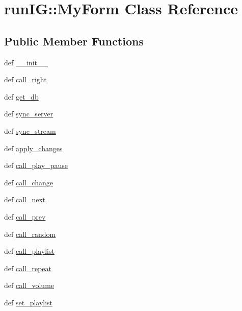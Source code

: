 \hypertarget{classrunIG_1_1MyForm}{
\section{runIG::MyForm Class Reference}
\label{classrunIG_1_1MyForm}
}
\subsection*{Public Member Functions}
\begin{DoxyCompactItemize}
\item 
def \hyperlink{classrunIG_1_1MyForm_a9d9f552af78608303dd1cb70f6d6f788}{\_\-\_\-init\_\-\_\-}
\item 
def \hyperlink{classrunIG_1_1MyForm_adb1a13ae48fdab99d7bb1afc7b12ea80}{call\_\-right}
\item 
def \hyperlink{classrunIG_1_1MyForm_a1ec95d0e4da5677507ac9817996838c9}{get\_\-db}
\item 
def \hyperlink{classrunIG_1_1MyForm_aad9eb7014ac06e3c3dfb6967313c5bfb}{sync\_\-server}
\item 
def \hyperlink{classrunIG_1_1MyForm_a965c1259e4922776fb00cc829c492842}{sync\_\-stream}
\item 
def \hyperlink{classrunIG_1_1MyForm_a7c1fc8b472aab7d4460ec61abd672538}{apply\_\-changes}
\item 
def \hyperlink{classrunIG_1_1MyForm_a15810e0e7a9630b5b7c11407740ab64d}{call\_\-play\_\-pause}
\item 
def \hyperlink{classrunIG_1_1MyForm_af6c215252133a7e524341b35b864ad86}{call\_\-change}
\item 
def \hyperlink{classrunIG_1_1MyForm_abe4585559708c18e35dcb9ed5633b4f3}{call\_\-next}
\item 
def \hyperlink{classrunIG_1_1MyForm_ab3c1631cfd36b7750550d726b6ce15ad}{call\_\-prev}
\item 
def \hyperlink{classrunIG_1_1MyForm_a37960ed144db7a7e2ef5dbe0bb27f442}{call\_\-random}
\item 
def \hyperlink{classrunIG_1_1MyForm_a8db1e454e42cfb386b9f237898ad605a}{call\_\-playlist}
\item 
def \hyperlink{classrunIG_1_1MyForm_afa3b7cafa1eb070a6eaee390464ec343}{call\_\-repeat}
\item 
def \hyperlink{classrunIG_1_1MyForm_afb441f1da6f2a61e5934f1bdf62a8ecd}{call\_\-volume}
\item 
def \hyperlink{classrunIG_1_1MyForm_a8482f0078c8e838ba8672b243b9bee66}{set\_\-playlist}
\item 

\end{DoxyCompactItemize}
